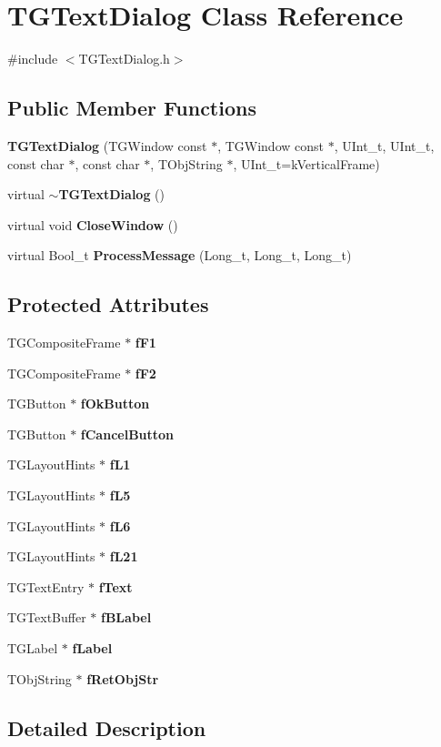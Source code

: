 \section{TGTextDialog Class Reference}
\label{classTGTextDialog}


{\ttfamily \#include $<$TGTextDialog.h$>$}\subsection*{Public Member Functions}
\begin{DoxyCompactItemize}
\item 
{\bf TGTextDialog} (TGWindow const $\ast$, TGWindow const $\ast$, UInt\_\-t, UInt\_\-t, const char $\ast$, const char $\ast$, TObjString $\ast$, UInt\_\-t=kVerticalFrame)
\item 
virtual {\bf $\sim$TGTextDialog} ()
\item 
virtual void {\bf CloseWindow} ()
\item 
virtual Bool\_\-t {\bf ProcessMessage} (Long\_\-t, Long\_\-t, Long\_\-t)
\end{DoxyCompactItemize}
\subsection*{Protected Attributes}
\begin{DoxyCompactItemize}
\item 
TGCompositeFrame $\ast$ {\bf fF1}
\item 
TGCompositeFrame $\ast$ {\bf fF2}
\item 
TGButton $\ast$ {\bf fOkButton}
\item 
TGButton $\ast$ {\bf fCancelButton}
\item 
TGLayoutHints $\ast$ {\bf fL1}
\item 
TGLayoutHints $\ast$ {\bf fL5}
\item 
TGLayoutHints $\ast$ {\bf fL6}
\item 
TGLayoutHints $\ast$ {\bf fL21}
\item 
TGTextEntry $\ast$ {\bf fText}
\item 
TGTextBuffer $\ast$ {\bf fBLabel}
\item 
TGLabel $\ast$ {\bf fLabel}
\item 
TObjString $\ast$ {\bf fRetObjStr}
\end{DoxyCompactItemize}


\subsection{Detailed Description}



